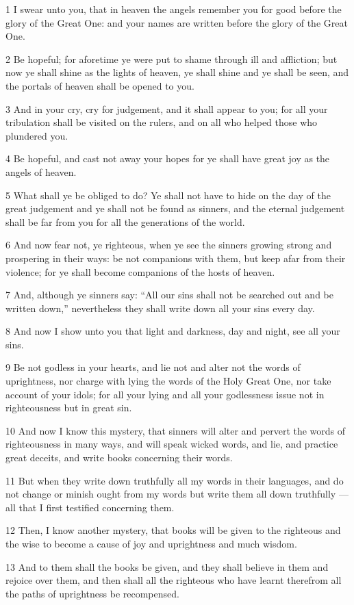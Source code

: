 \par 1 I swear unto you, that in heaven the angels remember you for good before the glory of the Great One: and your names are written before the glory of the Great One.
\par 2 Be hopeful; for aforetime ye were put to shame through ill and affliction; but now ye shall shine as the lights of heaven, ye shall shine and ye shall be seen, and the portals of heaven shall be opened to you.
\par 3 And in your cry, cry for judgement, and it shall appear to you; for all your tribulation shall be visited on the rulers, and on all who helped those who plundered you.
\par 4 Be hopeful, and cast not away your hopes for ye shall have great joy as the angels of heaven.
\par 5 What shall ye be obliged to do? Ye shall not have to hide on the day of the great judgement and ye shall not be found as sinners, and the eternal judgement shall be far from you for all the generations of the world.
\par 6 And now fear not, ye righteous, when ye see the sinners growing strong and prospering in their ways: be not companions with them, but keep afar from their violence; for ye shall become companions of the hosts of heaven.
\par 7 And, although ye sinners say: “All our sins shall not be searched out and be written down,” nevertheless they shall write down all your sins every day.
\par 8 And now I show unto you that light and darkness, day and night, see all your sins.
\par 9 Be not godless in your hearts, and lie not and alter not the words of uprightness, nor charge with lying the words of the Holy Great One, nor take account of your idols; for all your lying and all your godlessness issue not in righteousness but in great sin.
\par 10 And now I know this mystery, that sinners will alter and pervert the words of righteousness in many ways, and will speak wicked words, and lie, and practice great deceits, and write books concerning their words.
\par 11 But when they write down truthfully all my words in their languages, and do not change or minish ought from my words but write them all down truthfully —all that I first testified concerning them.
\par 12 Then, I know another mystery, that books will be given to the righteous and the wise to become a cause of joy and uprightness and much wisdom.
\par 13 And to them shall the books be given, and they shall believe in them and rejoice over them, and then shall all the righteous who have learnt therefrom all the paths of uprightness be recompensed.

